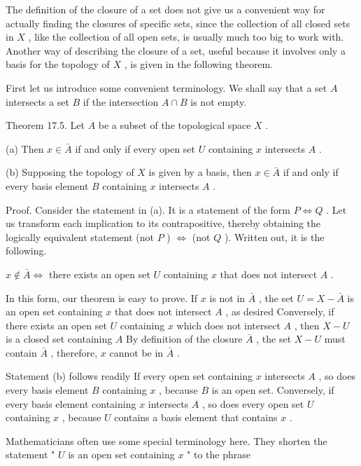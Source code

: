 \documentclass[10pt]{article}
\begin{document}
The definition of the closure of a set does not give us a convenient way for actually finding the closures of specific sets, since the collection of all closed sets in \(X\) , like the collection of all open sets, is usually much too big to work with. Another way of describing the closure of a set, useful because it involves only a basis for the topology of \(X\) , is given in the following theorem.

First let us introduce some convenient terminology. We shall say that a set \(A\) intersects a set \(B\) if the intersection \(A \cap  B\) is not empty.

Theorem 17.5. Let \(A\) be a subset of the topological space \(X\) .

(a) Then \(x \in  \bar{A}\) if and only if every open set \(U\) containing \(x\) intersects \(A\) .

(b) Supposing the topology of \(X\) is given by a basis, then \(x \in  \bar{A}\) if and only if every basis element \(B\) containing \(x\) intersects \(A\) .

Proof. Consider the statement in (a). It is a statement of the form \(P \Leftrightarrow  Q\) . Let us transform each implication to its contrapositive, thereby obtaining the logically equivalent statement (not \(P\) ) \(\Leftrightarrow\) (not \(Q\) ). Written out, it is the following.

\(x \notin  \bar{A} \Leftrightarrow\) there exists an open set \(U\) containing \(x\) that does not intersect \(A\) .

In this form, our theorem is easy to prove. If \(x\) is not in \(\bar{A}\) , the set \(U = X - \bar{A}\) is an open set containing \(x\) that does not intersect \(A\) , as desired Conversely, if there exists an open set \(U\) containing \(x\) which does not intersect \(A\) , then \(X - U\) is a closed set containing \(A\) By definition of the closure \(\bar{A}\) , the set \(X - U\) must contain \(\bar{A}\) , therefore, \(x\) cannot be in \(\bar{A}\) .

Statement (b) follows readily If every open set containing \(x\) intersects \(A\) , so does every basis element \(B\) containing \(x\) , because \(B\) is an open set. Conversely, if every basis element containing \(x\) intersects \(A\) , so does every open set \(U\) containing \(x\) , because \(U\) contains a basis element that contains \(x\) .

Mathematicians often use some special terminology here. They shorten the statement " \(U\) is an open set containing \(x\) " to the phrase
\end{document}

